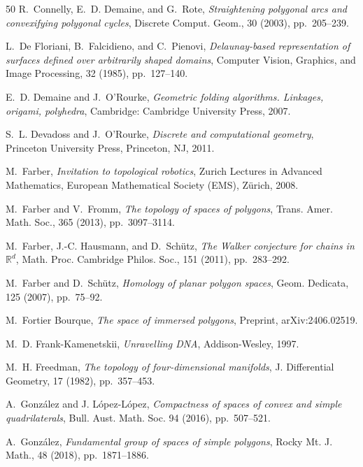 \documentclass[11pt,letterpaper]{amsart}
\theoremstyle{plain}
\theoremstyle{definition}
\theoremstyle{remark}
\numberwithin{equation}{section}
\begin{document}
\begin{thebibliography}{50}
{\sc R.~Connelly, E.~D. Demaine, and G.~Rote}, {\em Straightening polygonal
  arcs and convexifying polygonal cycles}, Discrete Comput. Geom., 30 (2003),
  pp.~205--239.

{\sc L.~{De Floriani}, B.~Falcidieno, and C.~Pienovi}, {\em Delaunay-based
  representation of surfaces defined over arbitrarily shaped domains}, Computer
  Vision, Graphics, and Image Processing, 32 (1985), pp.~127--140.

{\sc E.~D. Demaine and J.~O'Rourke}, {\em Geometric folding algorithms.
  {Linkages}, origami, polyhedra}, Cambridge: Cambridge University Press, 2007.

{\sc S.~L. Devadoss and J.~O'Rourke}, {\em Discrete and computational
  geometry}, Princeton University Press, Princeton, NJ, 2011.


{\sc M.~Farber}, {\em Invitation to topological robotics}, Zurich Lectures in
  Advanced Mathematics, European Mathematical Society (EMS), Z\"urich, 2008.

{\sc M.~Farber and V.~Fromm}, {\em The topology of spaces of polygons}, Trans.
  Amer. Math. Soc., 365 (2013), pp.~3097--3114.

{\sc M.~Farber, J.-C. Hausmann, and D.~Sch\"utz}, {\em The {W}alker conjecture
  for chains in {$\mathbb{R}^d$}}, Math. Proc. Cambridge Philos. Soc., 151
  (2011), pp.~283--292.

{\sc M.~Farber and D.~Sch\"utz}, {\em Homology of planar polygon spaces}, Geom.
  Dedicata, 125 (2007), pp.~75--92.


{\sc M.~Fortier Bourque}, {\em The space of immersed polygons},
\newblock Preprint, {arXiv}:2406.02519.%


{\sc M.~D. Frank-Kamenetskii}, {\em Unravelling {DNA}}, Addison-Wesley, 1997.

{\sc M.~H. Freedman}, {\em The topology of four-dimensional manifolds}, J.
  Differential Geometry, 17 (1982), pp.~357--453.

{\sc A.~Gonz\'{a}lez and J. L\'{o}pez-L\'{o}pez}, {\em Compactness of spaces of convex and simple quadrilaterals},
Bull. Aust. Math. Soc. 94 (2016), pp.~507--521.



{\sc A.~Gonz\'{a}lez}, {\em Fundamental group of spaces of simple polygons},
  Rocky Mt. J. Math., 48 (2018), pp.~1871--1886.




\end{thebibliography}
\end{document}
